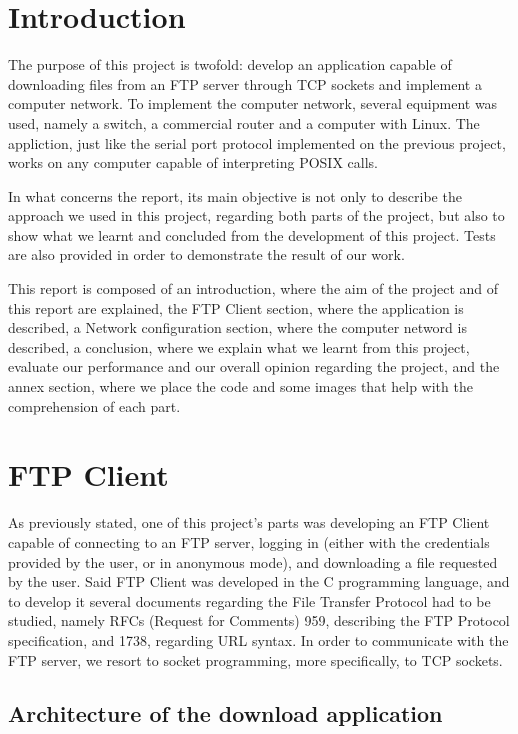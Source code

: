 \documentclass[11pt,a4paper,reqno]{article}
\numberwithin{equation}{section}
\begin{document}
\section{Introduction}

	The purpose of this project is twofold: develop an application capable of downloading files from an FTP server through TCP sockets and implement a computer network. To implement the computer network, several equipment was used, namely a switch, a commercial router and a computer with Linux. The appliction, just like the serial port protocol implemented on the previous project, works on any computer capable of interpreting POSIX calls.
	
	In what concerns the report, its main objective is not only to describe the approach we used in this project, regarding both parts of the project, but also to show what we learnt and concluded from the development of this project. Tests are also provided in order to demonstrate the result of our work.
	
	This report is composed of an introduction, where the aim of the project and of this report are explained, the FTP Client section, where the application is described, a Network configuration section, where the computer netword is described, a conclusion, where we explain what we learnt from this project, evaluate our performance and our overall opinion regarding the project, and the annex section, where we place the code and some images that help with the comprehension of each part.

\section{FTP Client}

As previously stated, one of this project’s parts was developing an FTP Client capable of connecting to an FTP server, logging in (either with the credentials provided by the user, or in anonymous mode), and downloading a file requested by the user. Said FTP Client was developed in the C programming language, and to develop it several documents regarding the File Transfer Protocol had to be studied, namely RFCs (Request for Comments) 959, describing the FTP Protocol specification, and 1738, regarding URL syntax. In order to communicate with the FTP server, we resort to socket programming, more specifically, to TCP sockets.

	\subsection{Architecture of the download application}
\end{document}
